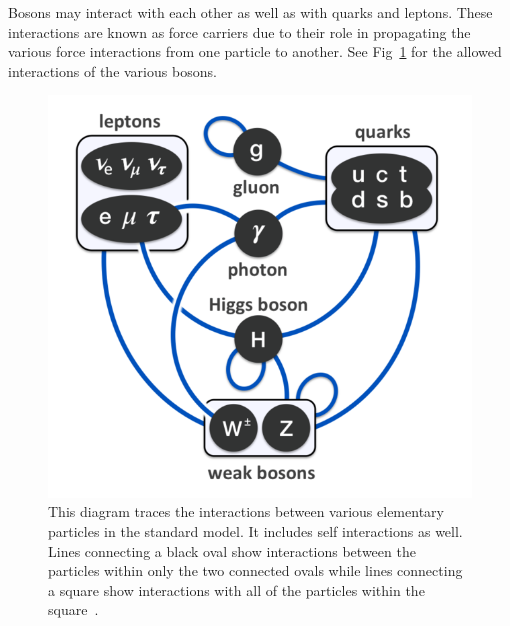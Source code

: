  
 Bosons may interact with each other as well as with quarks and leptons. These interactions are known as force carriers due to their role in propagating the various force interactions from one particle to another. See Fig~\ref{fig:boson_interactions} for the allowed interactions of the various bosons.
 
 \begin{figure}[h]
\begin{center}
\includegraphics[width=0.8\linewidth]{Figs/particle_interactions_in_SM.png}
\caption{\label{fig:boson_interactions}
 This diagram traces the interactions between various elementary particles in the standard model. It includes self interactions as well. Lines connecting a black oval show interactions between the particles within only the two connected ovals while lines connecting a square show interactions with all of the particles within the square~\cite{wikiinteractions}.
}
\end{center}
\end{figure}


